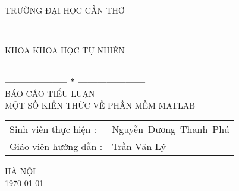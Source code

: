 \documentclass[12pt,a4paper]{article}
\begin{document}
\thispagestyle{empty}
\thisfancypage{
\setlength{\fboxsep}{0pt}
\fbox}{} 
\begin{center}
\begin{large}
TRƯỜNG ĐẠI HỌC CẦN THƠ
\end{large} \\
\begin{large}
KHOA KHOA HỌC TỰ NHIÊN
\end{large} \\
\textbf{--------------------  *  ---------------------}\\[7cm]
{\fontsize{32pt}{1}\selectfont BÁO CÁO TIỂU LUẬN}\\
{\fontsize{20pt}{1}\selectfont MỘT SỐ KIẾN THỨC VỀ PHẦN MỀM MATLAB}\\[5cm]
\end{center}


\indent \begin{tabular}{ll}
  Sinh viên thực hiện : &Nguyễn~Dương~Thanh~Phú \\
  Giáo viên hướng dẫn : &Trần Văn Lý 
\end{tabular}



\vspace{6cm}
\begin{center}
{\fontsize{16pt}{1}\selectfont HÀ NỘI}\\
{\fontsize{16pt}{1}\selectfont \today}
\end{center}
\end{document}
